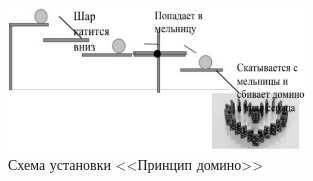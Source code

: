 \begin{figure}[h!]
  \begin{center}
    \includegraphics[width=0.7\textwidth]{authors/leybovich-fig2.png}
  \end{center}
  \caption{Схема установки <<Принцип домино>>}
  \label{fig:leybovich-fig2}
\end{figure}
